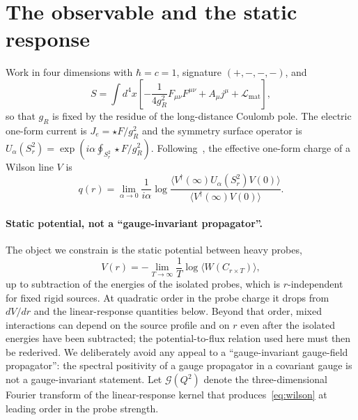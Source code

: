 \documentclass[11pt]{article}
\theoremstyle{definition}
\theoremstyle{remark}
\newcommand{\Gcal}{\mathcal{G}}
\begin{document}
\section{The observable and the static response}
\label{sec:observable}

Work in four dimensions with $\hbar=c=1$, signature $(+,-,-,-)$, and
\begin{equation}
S=\int d^{4}x\left[-\frac{1}{4g_{R}^{2}}F_{\mu\nu}F^{\mu\nu}
+A_{\mu}j^{\mu}+\mathcal{L}_{\mathrm{mat}}\right],
\end{equation}
so that $g_R$ is fixed by the residue of the long-distance Coulomb pole. The
electric one-form current is $J_{e}=\star F/g_{R}^{2}$ and the symmetry surface
operator is $U_{\alpha}(S^{2}_{r})=\exp(i\alpha\oint_{S^{2}_{r}}\star
F/g_{R}^{2})$. Following~\cite{cordova_ohmori_rudelius_2022,
basile_golmohammadi_2025}, the effective one-form charge of a Wilson line $V$ is
\begin{equation}
q(r)=\lim_{\alpha\to0}\frac{1}{i\alpha}
\log\frac{\langle V^{\dagger}(\infty)U_{\alpha}(S^{2}_{r})V(0)\rangle}
{\langle V^{\dagger}(\infty)V(0)\rangle}.
\label{eq:qdef}
\end{equation}

\paragraph{Static potential, not a ``gauge-invariant propagator''.}
The object we constrain is the static potential between heavy probes,
\begin{equation}
V(r)=-\lim_{T\to\infty}\frac{1}{T}\log\langle W(C_{r\times T})\rangle,
\label{eq:wilson}
\end{equation}
up to subtraction of the energies of the isolated probes, which is
$r$-independent for fixed rigid sources. At quadratic order in the probe
charge it drops from $dV/dr$ and the linear-response quantities below.
Beyond that order, mixed interactions can depend on the source profile and
on $r$ even after the isolated energies have been subtracted; the
potential-to-flux relation used here must then be rederived. We deliberately avoid any
appeal to a ``gauge-invariant gauge-field propagator'': the spectral positivity
of a gauge propagator in a covariant gauge is not a gauge-invariant statement.
Let $\Gcal(Q^{2})$ denote the three-dimensional Fourier transform of the
linear-response kernel that produces~\eqref{eq:wilson} at leading order in the
probe strength.
\end{document}

